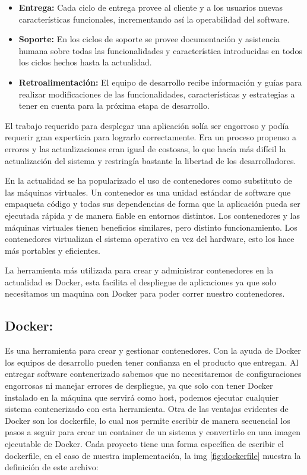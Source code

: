 \begin{itemize}
	\item \textbf{Entrega:} Cada ciclo de entrega provee al cliente y a los usuarios nuevas características funcionales, incrementando así la operabilidad del software.
    \item \textbf{Soporte:} En los ciclos de soporte se provee documentación y asistencia humana sobre todas las funcionalidades y característica introducidas en todos los ciclos hechos hasta la actualidad.
    \item \textbf{Retroalimentación:} El equipo de desarrollo recibe información y guías para realizar modificaciones de las funcionalidades, características y estrategias a tener en cuenta para la próxima etapa de desarrollo.
    
\end{itemize}

El trabajo requerido para desplegar una aplicación solía ser engorroso y podía requerir gran experticia para lograrlo correctamente. Era un proceso propenso a errores y las actualizaciones eran igual de costosas, lo que hacía más difícil la actualización del sistema y restringía bastante la libertad de los desarrolladores. 
\newline

En la actualidad se ha popularizado el uso de contenedores como substituto de las máquinas virtuales.
 Un contenedor es una unidad estándar de software que empaqueta código y todas sus dependencias de forma que la aplicación pueda ser ejecutada rápida y de manera fiable en entornos distintos. Los contenedores y las máquinas virtuales tienen beneficios similares, pero distinto funcionamiento. Los contenedores virtualizan el sistema operativo en vez del hardware, esto los hace más portables y eficientes.
\newline

La herramienta más utilizada para crear y administrar contenedores en la actualidad es Docker, esta facilita el despliegue de aplicaciones ya que solo necesitamos un maquina con Docker para poder correr nuestro contenedores.

\subsection{Docker:}

Es una herramienta para crear y gestionar contenedores. Con la ayuda de Docker los equipos de desarrollo pueden tener confianza en el producto que entregan. Al entregar software contenerizado sabemos que no necesitaremos de configuraciones engorrosas ni manejar errores de despliegue, ya que solo con  tener Docker instalado en la máquina que servirá como host, podemos ejecutar cualquier sistema contenerizado con esta herramienta. Otra de las ventajas evidentes de Docker son los dockerfile, lo cual nos permite escribir de manera secuencial los pasos a seguir para crear un container de un sistema y convertirlo en una imagen ejecutable de Docker. Cada proyecto tiene una forma específica de escribir el dockerfile, en el caso de nuestra implementación, la img \ref{fig:dockerfile} muestra la definición de este archivo:


